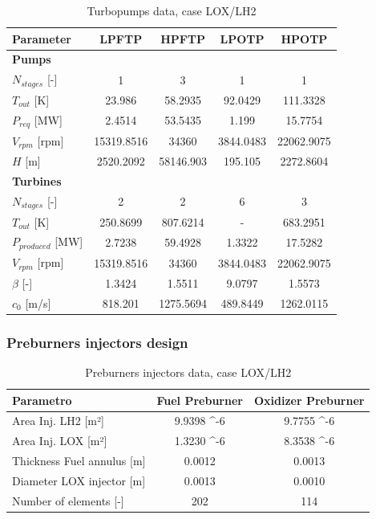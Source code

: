 \begin{table}[H]
\centering
\begin{tabular}{|l|c|c|c|c|}
\hline
\textbf{Parameter} & \textbf{LPFTP} & \textbf{HPFTP} & \textbf{LPOTP} & \textbf{HPOTP} \\ \hline
\textbf{Pumps} & & & & \\ \hline
$N_{stages}$ [-] & 1 & 3 & 1 & 1 \\ \hline
$T_{out}$  [K] & 23.986 & 58.2935 & 92.0429 & 111.3328\\ \hline
$P_{req}$ [MW] & 2.4514 & 53.5435 & 1.199 & 15.7754 \\ \hline
$V_{rpm}$ [rpm] & 15319.8516 & 34360 & 3844.0483 & 22062.9075 \\ \hline
$H$ [m] & 2520.2092 & 58146.903 & 195.105 & 2272.8604 \\ \hline
\textbf{Turbines} & & & & \\ \hline
$N_{stages}$ [-] & 2 & 2 & 6 & 3 \\ \hline
$T_{out}$  [K] & 250.8699 & 807.6214 & - & 683.2951 \\ \hline
$P_{produced}$ [MW] & 2.7238 & 59.4928 & 1.3322 & 17.5282 \\ \hline
$V_{rpm}$ [rpm] & 15319.8516 & 34360 & 3844.0483 & 22062.9075 \\ \hline
$\beta$ [-]& 1.3424 & 1.5511 & 9.0797 & 1.5573 \\ \hline
$c_{0}$  [m/s] & 818.201 & 1275.5694 & 489.8449 & 1262.0115 \\ \hline
\end{tabular}
\caption{Turbopumps data, case LOX/LH2}
\label{tab:turbo_pump_ox_fuel}
\end{table}

\subsubsection{Preburners injectors design}

\begin{table}[H]
\centering
\begin{tabular}{|l|c|c|}
\hline
\textbf{Parametro} & \textbf{Fuel Preburner} & \textbf{Oxidizer Preburner} \\ \hline
Area Inj. LH2 [m²] & 9.9398 \times 10^{-6} & 9.7755 \times 10^{-6} \\ \hline
Area Inj. LOX [m²]& 1.3230 \times 10^{-6} & 8.3538 \times 10^{-6} \\ \hline
Thickness Fuel annulus [m] & 0.0012 & 0.0013 \\ \hline
Diameter LOX injector [m] & 0.0013 & 0.0010 \\ \hline
Number of elements  [-] & 202 & 114 \\ \hline
\end{tabular}
\caption{Preburners injectors data, case LOX/LH2}
\label{tab:preburner_data}
\end{table}

